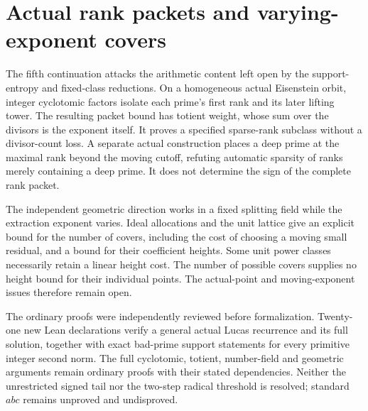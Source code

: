 \section{Actual rank packets and varying-exponent covers}
\label{sec:cyclotomic-covers-checkpoint}

The fifth continuation attacks the arithmetic content left open by the
support-entropy and fixed-class reductions. On a homogeneous actual
Eisenstein orbit, integer cyclotomic factors isolate each prime's first
rank and its later lifting tower. The resulting packet bound has totient
weight, whose sum over the divisors is the exponent itself. It proves a
specified sparse-rank subclass without a divisor-count loss. A separate
actual construction places a deep prime at the maximal rank beyond the
moving cutoff, refuting automatic sparsity of ranks merely containing a
deep prime. It does not determine the sign of the complete rank packet.

The independent geometric direction works in a fixed splitting field
while the extraction exponent varies. Ideal allocations and the unit
lattice give an explicit bound for the number of covers, including the
cost of choosing a moving small residual, and a bound for their coefficient
heights. Some unit power classes necessarily retain a linear height cost.
The number of possible covers supplies no height bound for their individual
points. The actual-point and moving-exponent issues therefore remain open.

The ordinary proofs were independently reviewed before formalization.
Twenty-one new Lean declarations verify a general actual Lucas recurrence
and its full solution, together with exact bad-prime support statements
for every primitive integer second norm. The full cyclotomic, totient,
number-field and geometric arguments remain ordinary proofs with their
stated dependencies. Neither the unrestricted signed tail nor the
two-step radical threshold is resolved; standard $abc$ remains unproved
and undisproved.
